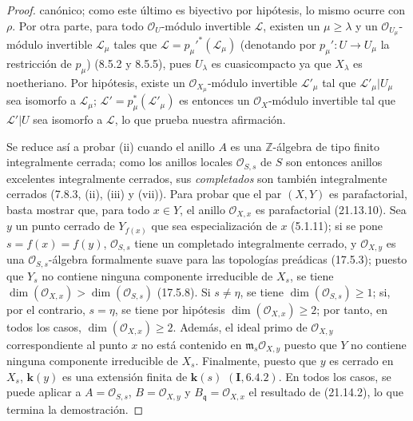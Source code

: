 \begin{proof}
canónico; como este último es biyectivo por hipótesis, lo mismo ocurre con $\rho$.
Por otra parte, para todo $\mathcal O_U$-módulo invertible $\mathscr L$, existen un
$\mu\geq\lambda$ y un $\mathcal O_{U_\mu}$-módulo invertible $\mathscr L_\mu$ tales
que $\mathscr L=p_\mu'^*(\mathscr L_\mu)$ (denotando por
$p_\mu':U\to U_\mu$ la restricción de $p_\mu$) (8.5.2 y 8.5.5), pues $U_\lambda$ es
cuasicompacto ya que $X_\lambda$ es noetheriano. Por hipótesis, existe un
$\mathcal O_{X_\mu}$-módulo invertible $\mathscr L'_\mu$ tal que
$\mathscr L'_\mu|U_\mu$ sea isomorfo a $\mathscr L_\mu$;
$\mathscr L'=p_\mu^*(\mathscr L'_\mu)$ es entonces un $\mathcal O_X$-módulo
invertible tal que $\mathscr L'|U$ sea isomorfo a $\mathscr L$, lo que prueba nuestra
afirmación.

Se reduce así a probar (ii) cuando el anillo $A$ es una
$\mathbb Z$-álgebra de tipo finito integralmente cerrada; como los anillos locales
$\mathcal O_{S,s}$ de $S$ son entonces anillos excelentes integralmente cerrados, sus
\emph{completados} son también integralmente cerrados (7.8.3, (ii), (iii) y (vii)). Para
probar que el par $(X,Y)$ es parafactorial, basta mostrar que, para todo
$x\in Y$, el anillo $\mathcal O_{X,x}$ es parafactorial (21.13.10). Sea $y$ un punto
cerrado de $Y_{f(x)}$ que sea especialización de $x$ (5.1.11); si se pone
$s=f(x)=f(y)$, $\mathcal O_{S,s}$ tiene un
completado integralmente cerrado, y $\mathcal O_{X,y}$ es una
$\mathcal O_{S,s}$-álgebra formalmente suave para las topologías preádicas
(17.5.3); puesto que $Y_s$ no contiene ninguna componente irreducible de $X_s$, se tiene
$\dim(\mathcal O_{X,x})>\dim(\mathcal O_{S,s})$ (17.5.8). Si $s\neq\eta$, se tiene
$\dim(\mathcal O_{S,s})\geq1$; si, por el contrario, $s=\eta$, se tiene por hipótesis
$\dim(\mathcal O_{X,x})\geq2$; por tanto, en todos los casos,
$\dim(\mathcal O_{X,x})\geq2$. Además, el ideal primo de $\mathcal O_{X,y}$
correspondiente al punto $x$ no está contenido en
$\mathfrak m_s\mathcal O_{X,y}$ puesto que $Y$ no contiene ninguna componente
irreducible de $X_s$. Finalmente, puesto que $y$ es cerrado en $X_s$, $\boldsymbol{k}(y)$ es una extensión
finita de $\boldsymbol{k}(s)$ $(\mathbf I, 6.4.2)$. En todos los casos, se puede aplicar a
$A=\mathcal O_{S,s}$, $B=\mathcal O_{X,y}$ y
$B_\mathfrak q=\mathcal O_{X,x}$ el resultado de (21.14.2), lo que termina la
demostración.
\end{proof}


